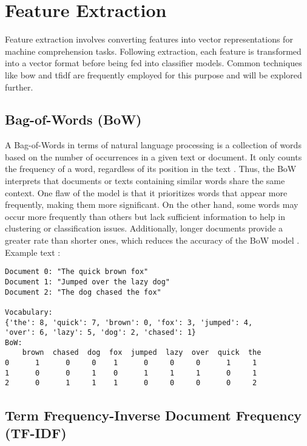 \section{Feature Extraction}

Feature extraction involves converting features into vector representations for machine comprehension tasks. Following extraction, each feature is transformed into a vector format before being fed into classifier models. Common techniques like \ac{bow} and \ac{tfidf} are frequently employed for this purpose and will be explored further.

\subsection{Bag-of-Words (BoW)}

A Bag-of-Words in terms of natural language processing is a collection of words based on the number of occurrences in a given text or document. It only counts the frequency of a word, regardless of its position in the text \citep{tabassum_survey_2020}. Thus, the BoW interprets that documents or texts containing similar words share the same context. One flaw of the model is that it prioritizes words that appear more frequently, making them more significant. On the other hand, some words may occur more frequently than others but lack sufficient information to help in clustering or classification issues. Additionally, longer documents provide a greater rate than shorter ones, which reduces the accuracy of the BoW model \citep{tabassum_survey_2020}. Example text \citep{openai_gpt3}:

\begin{verbatim}
Document 0: "The quick brown fox"
Document 1: "Jumped over the lazy dog"
Document 2: "The dog chased the fox"

Vocabulary: 
{'the': 8, 'quick': 7, 'brown': 0, 'fox': 3, 'jumped': 4,
'over': 6, 'lazy': 5, 'dog': 2, 'chased': 1}
BoW:
    brown  chased  dog  fox  jumped  lazy  over  quick  the
0      1      0     0    1      0     0     0      1     1
1      0      0     1    0      1     1     1      0     1
2      0      1     1    1      0     0     0      0     2
\end{verbatim}


\subsection{Term Frequency-Inverse Document Frequency (TF-IDF)}

